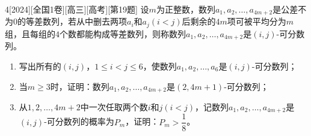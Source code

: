 \begin{example}{4}[2024][全国1卷][高三][高考][第19题]
设$m$为正整数，数列$a_1,a_2,\dots,a_{4m+2}$是公差不为$0$的等差数列，若从中删去两项$a_i$和$a_j(i<j)$后剩余的$4m$项可被平均分为$m$组，且每组的$4$个数都能构成等差数列，则称数列$a_1,a_2,\dots,a_{4m+2}$是$(i,j)$-可分数列。
\begin{enumerate}
\item 写出所有的$(i,j)$，$1\le i<j\le 6$，使数列$a_1,a_2,\dots,a_6$是$(i,j)$-可分数列；
\item 当$m\ge 3$时，证明：数列$a_1,a_2,\dots,a_{4m+2}$是$(2,4m+1)$-可分数列；
\item 从$1,2,\dots,4m+2$中一次任取两个数$i$和$j(i<j)$，记数列$a_1,a_2,\dots,a_{4m+2}$是$(i,j)$-可分数列的概率为$P_m$，证明：$P_m>\dfrac{1}{8}$。
\end{enumerate}
\end{example}